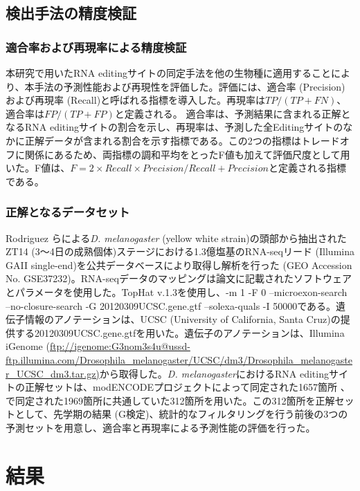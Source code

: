 \subsection{検出手法の精度検証}
\subsubsection{適合率および再現率による精度検証}
本研究で用いたRNA editingサイトの同定手法を他の生物種に適用することにより、本手法の予測性能および再現性を評価した。評価には、適合率 (Precision)および再現率 (Recall)と呼ばれる指標を導入した。再現率は$TP/(TP+FN)$、適合率は$FP/(TP+FP)$と定義される。 適合率は、予測結果に含まれる正解となるRNA editingサイトの割合を示し、再現率は、予測した全Editingサイトのなかに正解データが含まれる割合を示す指標である。この2つの指標はトレードオフに関係にあるため、両指標の調和平均をとったF値も加えて評価尺度として用いた。F値は、$F=2 \times Recall \times Precision/Recall+Precision$と定義される指標である。

\subsubsection{正解となるデータセット}
Rodriguez \citep{pmid22658416}らによる{\it D. melanogaster} (yellow white strain)の頭部から抽出されたZT14 (3〜4日の成熟個体)ステージにおける1.3億塩基のRNA-seqリード (Illumina GAII single-end)を公共データベースにより取得し解析を行った (GEO Accession No. GSE37232)。RNA-seqデータのマッピングは論文に記載されたソフトウェアとパラメータを使用した。TopHat v.1.3を使用し、-m 1 -F 0 --microexon-search --no-closure-search -G 20120309UCSC.gene.gtf --solexa-quals -I 50000である。遺伝子情報のアノテーションは、UCSC (University of California, Santa Cruz)の提供する20120309UCSC.gene.gtfを用いた。遺伝子のアノテーションは、Illumina iGenome (\url {ftp://igenome:G3nom3s4u@ussd-ftp.illumina.com/Drosophila_melanogaster/UCSC/dm3/Drosophila_melanogaster_UCSC_dm3.tar.gz)}から取得した。{\it D. melanogaster}におけるRNA editingサイトの正解セットは、modENCODEプロジェクトによって同定された1657箇所 \citep{pmid21179090}、\citep{pmid22658416}で同定された1969箇所に共通していた312箇所を用いた。この312箇所を正解セットとして、先学期の結果 (G検定)、統計的なフィルタリングを行う前後の3つの予測セットを用意し、適合率と再現率による予測性能の評価を行った。


\section{結果}
